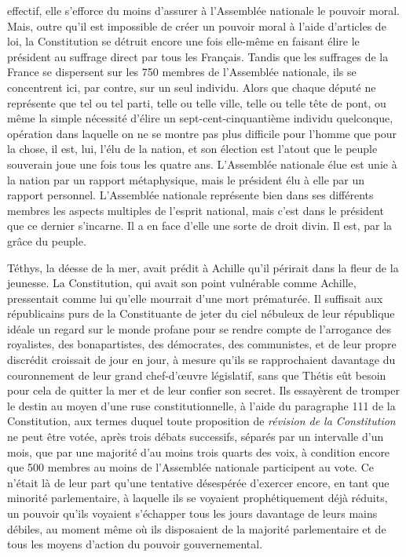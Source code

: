 \documentclass[french,twoside]{book} %
\begin{document}
effectif, elle s’efforce du moins d’assurer à l’Assemblée nationale le pouvoir moral. Mais, outre qu’il est impossible de créer un pouvoir moral à l’aide d’articles de loi, la Constitution se détruit encore une fois elle-même en faisant élire le président au suffrage direct par tous les Français. Tandis que les suffrages de la France se dispersent sur les 750 membres de l’Assemblée nationale, ils se concentrent ici, par contre, sur un seul individu. Alors que chaque député ne représente que tel ou tel parti, telle ou telle ville, telle ou telle tête de pont, ou même la simple nécessité d’élire un sept-cent-cinquantième individu quelconque, opération dans laquelle on ne se montre pas plus difficile pour l’homme que pour la chose, il est, lui, l’élu de la nation, et son élection est l’atout que le peuple souverain joue une fois tous les quatre ans. L’Assemblée nationale élue est unie à la nation par un rapport métaphysique, mais le président élu à elle par un rapport personnel. L’Assemblée nationale représente bien dans ses différents membres les aspects multiples de l’esprit national, mais c’est dans le président que ce dernier s’incarne. Il a en face d’elle une sorte de droit divin. Il est, par la grâce du peuple.\par
Téthys, la déesse de la mer, avait prédit à Achille qu’il périrait dans la fleur de la jeunesse. La Constitution, qui avait son point vulnérable comme Achille, pressentait comme lui qu’elle mourrait d’une mort prématurée. Il suffisait aux républicains purs de la Constituante de jeter du ciel nébuleux de leur république idéale un regard sur le monde profane pour se rendre compte de l’arrogance des royalistes, des bonapartistes, des démocrates, des communistes, et de leur propre discrédit croissait de jour en jour, à mesure qu’ils se rapprochaient davantage du couronnement de leur grand chef-d’œuvre législatif, sans que Thétis eût besoin pour cela de quitter la mer et de leur confier son secret. Ils essayèrent de tromper le destin au moyen d’une ruse constitutionnelle, à l’aide du paragraphe 111 de la Constitution, aux termes duquel toute proposition de \emph{révision de la Constitution} ne peut être votée, après trois débats successifs, séparés par un intervalle d’un mois, que par une majorité d’au moins trois quarts des voix, à condition encore que 500 membres au moins de l’Assemblée nationale participent au vote. Ce n’était là de leur part qu’une tentative désespérée d’exercer encore, en tant que minorité parlementaire, à laquelle ils se voyaient prophétiquement déjà réduits, un pouvoir qu’ils voyaient s’échapper tous les jours davantage de leurs mains débiles, au moment même où ils disposaient de la majorité parlementaire et de tous les moyens d’action du pouvoir gouvernemental.\par
\end{document}
